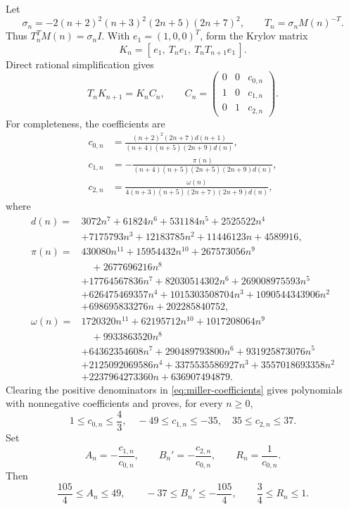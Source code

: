 Let
\[
\sigma_n=-2(n+2)^2(n+3)^2(2n+5)(2n+7)^2,\qquad
        T_n=\sigma_nM(n)^{-T}.
\]
Thus $T_n^TM(n)=\sigma_nI$.  With $e_1=(1,0,0)^T$, form the Krylov matrix
\[
       K_n=[\,e_1,\ T_ne_1,\ T_nT_{n+1}e_1\,].
\]
Direct rational simplification gives
\begin{equation}\label{eq:miller-companion}
       T_nK_{n+1}=K_nC_n,\qquad
 C_n=\begin{pmatrix}0&0&c_{0,n}\\1&0&c_{1,n}\\0&1&c_{2,n}\end{pmatrix}.
\end{equation}
For completeness, the coefficients are
\begin{align}
c_{0,n}&=\frac{(n+2)^2(2n+7)d(n+1)}
 {(n+4)(n+5)(2n+9)d(n)},\nonumber\\
c_{1,n}&=-\frac{\pi(n)}
 {(n+4)(n+5)(2n+5)(2n+9)d(n)},\label{eq:miller-coefficients}\\
c_{2,n}&=\frac{\omega(n)}
 {4(n+3)(n+5)(2n+7)(2n+9)d(n)},\nonumber
\end{align}
where
\begin{align*}
d(n)={}&3072n^7+61824n^6+531184n^5+2525522n^4\\
 &+7175793n^3+12183785n^2+11446123n+4589916,\\
\pi(n)={}&430080n^{11}+15954432n^{10}+267573056n^9\\
&\quad+2677696216n^8\\
&+17764567836n^7+82030514302n^6+269008975593n^5\\
&+626475469357n^4+1015303508704n^3+1090544343906n^2\\
&+698695833276n+202285840752,\\
\omega(n)={}&1720320n^{11}+62195712n^{10}+1017208064n^9\\
&\quad+9933863520n^8\\
&+64362354608n^7+290489793800n^6+931925873076n^5\\
&+2125092069586n^4+3375535586927n^3+3557018693358n^2\\
&+2237964273360n+636907494879.
\end{align*}
Clearing the positive denominators in \eqref{eq:miller-coefficients} gives
polynomials with nonnegative coefficients and proves, for every $n\geq0$,
\begin{equation}\label{eq:miller-coeff-bounds}
 1\leq c_{0,n}\leq\frac43,\quad
 -49\leq c_{1,n}\leq-35,\quad
 35\leq c_{2,n}\leq37.
\end{equation}
Set
\[
 A_n=-\frac{c_{1,n}}{c_{0,n}},\qquad
 B_n'=-\frac{c_{2,n}}{c_{0,n}},\qquad
 R_n=\frac1{c_{0,n}}.
\]
Then
\begin{equation}\label{eq:miller-pull-bounds}
 \frac{105}{4}\leq A_n\leq49,\qquad
 -37\leq B_n'\leq-\frac{105}{4},\qquad
 \frac34\leq R_n\leq1.
\end{equation}

